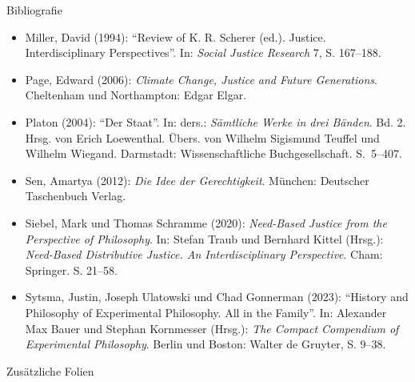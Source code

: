 \documentclass[xcolor=table,9pt,aspectratio=169]{beamer}
\begin{document}
\begin{frame}{\vspace*{10mm}Bibliografie}
\vspace*{-10mm}
{\footnotesize
\begin{itemize}[label=,leftmargin=2em,itemindent=-2em]
   \item Miller, David (1994): \enquote{Review of K. R. Scherer (ed.). Justice. Interdisciplinary Perspectives}. In: \textit{Social Justice Research} 7, S. 167--188.
   \item Page, Edward (2006): \textit{Climate Change, Justice and Future Generations}. Cheltenham und Northampton: Edgar Elgar.
   \item Platon (2004): \enquote{Der Staat}. In: ders.: \textit{Sämtliche Werke in drei Bänden}. Bd. 2. Hrsg. von Erich Loewenthal. Übers. von Wilhelm Sigismund Teuffel und Wilhelm Wiegand. Darmstadt: Wissenschaftliche Buchgesellschaft. S.~5--407.
   \item Sen, Amartya (2012): \textit{Die Idee der Gerechtigkeit}. München: Deutscher Taschenbuch Verlag.
   \item Siebel, Mark und Thomas Schramme (2020): \textit{Need-Based Justice from the Perspective of Philosophy}. In: Stefan Traub und Bernhard Kittel (Hrsg.): \textit{Need-Based Distributive Justice. An Interdisciplinary Perspective}. Cham: Springer. S. 21--58.
   \item Sytsma, Justin, Joseph Ulatowski und Chad Gonnerman (2023): \enquote{History and Philosophy of Experimental Philosophy. All in the Family}. In: Alexander Max Bauer und Stephan Kornmesser (Hrsg.): \textit{The Compact Compendium of Experimental Philosophy}. Berlin und Boston: Walter de Gruyter, S. 9--38.
\end{itemize}
}
\end{frame}


\begin{frame}
\begin{overlayarea}{\textwidth}{0.81\paperheight}{
   \vspace*{11mm}
   \textcolor{uolblue}
   {Zusätzliche Folien}
}
\end{overlayarea}
\end{frame}
\end{document}
